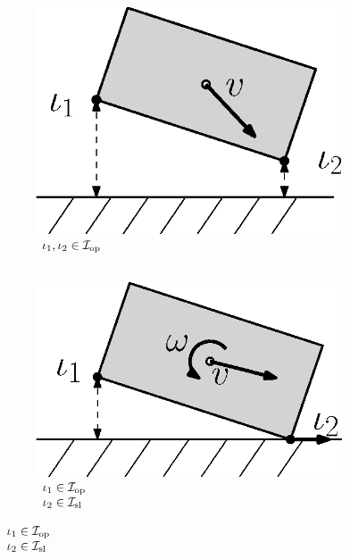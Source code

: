 \documentclass[../DC2017114Bouma.tex]{subfiles}
\begin{document}
\begin{figure}[h]
\centering
\begin{subfigure}[b]{0.17\textwidth}
\centering
\includegraphics[width=\textwidth]{example1.eps}
\caption{$\begin{array}{l}
\iota_1,\iota_2\in\mathcal{I}_{\textnormal{op}}\\ \hspace{0cm}
\end{array}$}
\label{fig:2example1}
\end{subfigure}
\quad
\begin{subfigure}[b]{0.17\textwidth}  
\centering 
\includegraphics[width=\textwidth]{example2.eps}
\caption{$\begin{array}{l}
\iota_1\in\mathcal{I}_{\textnormal{op}}\\\iota_2\in\mathcal{I}_{\textnormal{sl}}
\end{array}$}
\label{fig:2example2}

\end{subfigure}
\end{figure}
\end{document}
